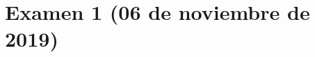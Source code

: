 \documentclass[a4paper,12pt,twoside]{book}
\begin{document}
\section{Examen 1 (06 de noviembre de 2019)}

\appendix %






\nocite{Alonso-12b}
\nocite{Bird-99a}
\nocite{Cunningham-10a}
\nocite{Daume-06}
\nocite{Davie-92a}
\nocite{Doets-04a}
\nocite{Fokker-96}
\nocite{Hudak-00a}
\nocite{Hudak-12a}
\nocite{Hutton-07a}
\nocite{OSullivan-08a}
\nocite{Rabhi-99a}
\nocite{Polya-65a}
\nocite{Ruiz-04}
\nocite{Thompson-11a}



\end{document}
